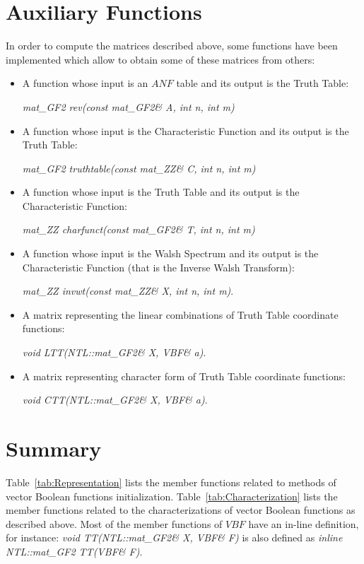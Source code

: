 \section{Auxiliary Functions}
\label{sec:Aux}

In order to compute the matrices described above, some functions have been
implemented which allow to obtain some of these matrices from others: 

\begin{itemize}
\item A function whose input is an $ANF$ table and its output is the Truth Table: 

\textit{mat\_GF2 rev(const mat\_GF2\& A, int n, int m)}
\item A function whose input is the Characteristic Function and its output is the Truth Table: 

\textit{mat\_GF2 truthtable(const mat\_ZZ\& C, int n, int m)}
\item A function whose input is the Truth Table and its output is the Characteristic Function: 

\textit{mat\_ZZ charfunct(const mat\_GF2\& T, int n, int m)}
\item A function whose input is the Walsh Spectrum and its output is the Characteristic Function (that is the Inverse Walsh Transform): 

\textit{mat\_ZZ invwt(const mat\_ZZ\& X, int n, int m)}.
\item A matrix representing the linear combinations of Truth Table coordinate functions: 

\textit{void LTT(NTL::mat\_GF2\& X, VBF\& a)}.
\item A matrix representing character form of Truth Table coordinate functions: 

\textit{void CTT(NTL::mat\_GF2\& X, VBF\& a)}.

\end{itemize}

\newpage

\section{Summary}
\label{section3.14}

Table~\ref{tab:Representation} lists the member functions related to
methods of vector Boolean functions initialization. Table~\ref{tab:Characterization} lists the member functions related to the
characterizations of vector Boolean functions as described above. Most of the member
functions of $VBF$ have an in-line definition, for instance: \textit{void 
  TT(NTL::mat\_GF2\& X, VBF\& F)} is also defined as \textit{inline
  NTL::mat\_GF2 TT(VBF\& F)}. 

